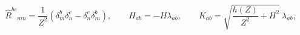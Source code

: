\begin{equation} \label{stuff}
\widehat
R^{bc}{}_{mn}=\frac{1}{Z^2}
  \left(\delta^b_m\delta^c_n-\delta^c_n\delta^b_m\right),
  \qquad H_{ab}=-H \lambda_{ab},
  \qquad K_{ab}=\sqrt{\frac{h(Z)}{Z^2}+H^2}
  ~\lambda_{ab},
\end{equation}

